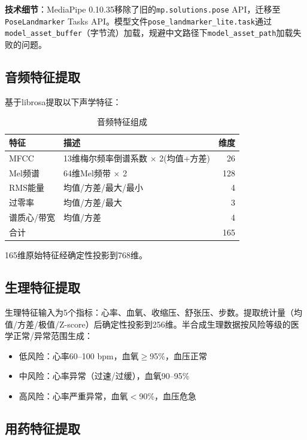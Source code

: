 \textbf{技术细节}：MediaPipe 0.10.35移除了旧的\texttt{mp.solutions.pose} API，迁移至\texttt{PoseLandmarker} Tasks API。模型文件\texttt{pose\_landmarker\_lite.task}通过\texttt{model\_asset\_buffer}（字节流）加载，规避中文路径下\texttt{model\_asset\_path}加载失败的问题。

\subsection{音频特征提取}

基于librosa\cite{mcfee2015librosa}提取以下声学特征：

\begin{table}[H]
\centering
\caption{音频特征组成}
\label{tab:audio_feat}
\begin{tabular}{llr}
\toprule
特征 & 描述 & 维度 \\
\midrule
MFCC & 13维梅尔频率倒谱系数 $\times$ 2(均值+方差) & 26 \\
Mel频谱 & 64维Mel频带 $\times$ 2 & 128 \\
RMS能量 & 均值/方差/最大/最小 & 4 \\
过零率 & 均值/方差/最大 & 3 \\
谱质心/带宽 & 均值/方差 & 4 \\
\midrule
合计 & & 165 \\
\bottomrule
\end{tabular}
\end{table}

165维原始特征经确定性投影到768维。

\subsection{生理特征提取}

生理特征输入为5个指标：心率、血氧、收缩压、舒张压、步数。提取统计量（均值/方差/极值/Z-score）后确定性投影到256维。半合成生理数据按风险等级的医学正常/异常范围生成：

\begin{itemize}
    \item 低风险：心率60--100 bpm，血氧$\geq$95\%，血压正常
    \item 中风险：心率异常（过速/过缓），血氧90--95\%
    \item 高风险：心率严重异常，血氧$<$90\%，血压危急
\end{itemize}

\subsection{用药特征提取}

